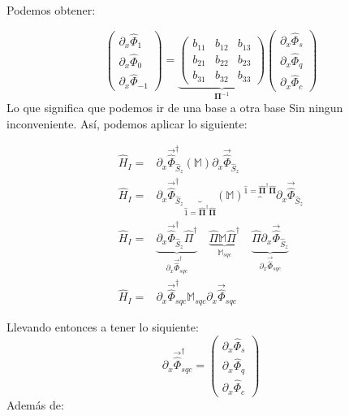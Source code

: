 Podemos obtener:


\begin{equation}
    \begin{pmatrix}
\partial_{x} \hat{\Phi}_{1} \\
\partial_{x} \hat{\Phi}_{0} \\
\partial_{x} \hat{\Phi}_{-1}
\end{pmatrix} = \underbrace{\begin{pmatrix}
b_{11} & b_{12} & b_{13} \\
b_{21} & b_{22} & b_{23} \\
b_{31} & b_{32} & b_{33}
\end{pmatrix}}_{\mathbf{\Pi}^{-1}}   \begin{pmatrix}
\partial_{x} \hat{\Phi}_{s} \\
\partial_{x} \hat{\Phi}_{q} \\
\partial_{x} \hat{\Phi}_{c}
\end{pmatrix}
\end{equation}
Lo que significa que podemos ir de una base a otra base Sin ningun inconveniente. Así, podemos aplicar lo siguiente:

\begin{align}
    \hat{H}_{I}=& \partial_{x} \vec{\hat{\Phi}}_{\hat{S}_{z}}^{\dagger}  (\mathbb{M}) \partial_{x} \vec{\hat{\Phi}}_{\hat{S}_{z}}  \\
   \hat{H}_{I}  =& \partial_{x} \vec{\hat{\Phi}}_{\hat{S}_{z}}^{\dagger} \underbrace{}_{\hat{1}=\mathbf{\hat{\Pi}}^{\dagger}\mathbf{\hat{\Pi}}} (\mathbb{M}) \overbrace{}^{\hat{1}=\mathbf{\hat{\Pi}}^{\dagger}\mathbf{\hat{\Pi}}} \partial_{x} \vec{\hat{\Phi}}_{\hat{S}_{z}} \\
   \hat{H}_{I}  =&   \underbrace{\partial_{x} \vec{\hat{\Phi}}_{\hat{S}_{z}}^{\dagger} \hat{\Pi}^{\dagger}
 }_{\partial_{x} \vec{\hat{\Phi}}_{sqc}^{\dagger}} \quad \underbrace{ \hat{\Pi} \mathbb{M} \hat{\Pi}^{\dagger}}_{\mathbb{M}_{sqc}} \quad \underbrace{\hat{\Pi} \partial_{x} \vec{\hat{\Phi}}_{\hat{S}_{z}}} _{\partial_{x} \vec{\hat{\Phi}}_{sqc}} \\
   \hat{H}_{I}  =&  \partial_{x} \vec{\hat{\Phi}}_{sqc}^{\dagger} \mathbb{M}_{sqc} \partial_{x} \vec{\hat{\Phi}}_{sqc}
\end{align}

Llevando entonces a tener lo siquiente:
\begin{equation}
     \partial_{x} \vec{\hat{\Phi}}_{sqc}^{\dagger}  = \begin{pmatrix}
\partial_{x} \hat{\Phi}_{s} \\
\partial_{x} \hat{\Phi}_{q} \\
\partial_{x} \hat{\Phi}_{c}
\end{pmatrix} 
\end{equation}
Además de:

